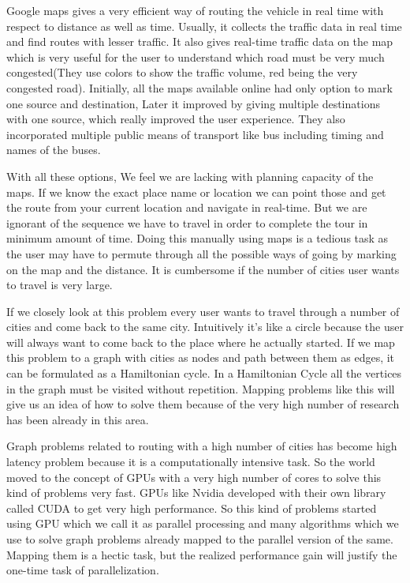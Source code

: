 \documentclass[conference]{IEEEtran}
\begin{document}
Google maps gives a very efficient way of routing the vehicle in real time with respect to distance as well as time. Usually, it collects the traffic data in real time and find routes with lesser traffic. It also gives real-time traffic data on the map which is very useful for the user to understand which road must be very much congested(They use colors to show the traffic volume, red being the very congested road).
Initially, all the maps available online had only option to mark one source and destination, Later it improved by giving multiple destinations with one source, which really improved the user experience. They also incorporated multiple public means of transport like bus including timing and names of the buses.

With all these options, We feel we are lacking with planning capacity of the maps. If we know the exact place name or location we can point those and get the route from your current location and navigate in real-time. But we are ignorant of the sequence we have to travel in order to complete the tour in minimum  amount of time. Doing this manually using maps is a tedious task as the user may have to permute through all the possible ways of going by marking on the map and the distance. It is cumbersome if the number of cities user wants to travel is very large.

If we closely look at this problem every user wants to travel through a number of cities and come back to the same city. Intuitively it's like a circle because the user will always want to come back to the place where he actually started. If we map this problem to a graph with cities as nodes and path between them as edges, it can be formulated as a Hamiltonian cycle. In a Hamiltonian Cycle all the vertices in the graph must be visited without repetition. Mapping problems like this will give us an idea of how to solve them because of the very high number of research has been already in this area.

Graph problems related to routing with a high number of cities has become high latency problem because it is a computationally intensive task. So the world moved to the concept of GPUs with a very high number of cores to solve this kind of problems very fast. GPUs like Nvidia developed with their own library called CUDA to get very high performance. So this kind of problems started using GPU which we call it as parallel processing and many algorithms which we use to solve graph problems already mapped to the parallel version of the same. Mapping them is a hectic task, but the realized performance gain will justify the one-time task of parallelization.
\end{document}
